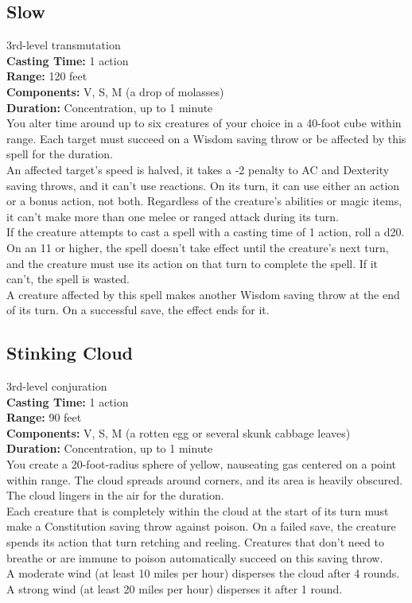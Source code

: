 \documentclass[11pt, A4paper, english]{article}
\begin{document}
		\subsection{Slow}
3rd-level transmutation \\
\textbf{Casting Time:} 1 action \\
\textbf{Range:} 120 feet \\
\textbf{Components:} V, S, M (a drop of molasses) \\
\textbf{Duration:} Concentration, up to 1 minute \\
You alter time around up to six creatures of your choice in a 40-foot cube within range. Each target must succeed on a Wisdom saving throw or be affected by this spell for the duration. \\
An affected target’s speed is halved, it takes a -2 penalty to AC and Dexterity saving throws, and it can’t use reactions. On its turn, it can use either an action or a bonus action, not both. Regardless of the creature’s abilities or magic items, it can’t make more than one melee or ranged attack during its turn. \\
If the creature attempts to cast a spell with a casting time of 1 action, roll a d20. On an 11 or higher, the spell doesn’t take effect until the creature’s next turn, and the creature must use its action on that turn to complete the spell. If it can’t, the spell is wasted. \\
A creature affected by this spell makes another Wisdom saving throw at the end of its turn. On a successful save, the effect ends for it.

		\subsection{Stinking Cloud}
3rd-level conjuration \\
\textbf{Casting Time:} 1 action \\
\textbf{Range:} 90 feet \\
\textbf{Components:} V, S, M (a rotten egg or several skunk cabbage leaves) \\
\textbf{Duration:} Concentration, up to 1 minute \\
You create a 20-foot-radius sphere of yellow, nauseating gas centered on a point within range. The cloud spreads around corners, and its area is heavily obscured. The cloud lingers in the air for the duration. \\
Each creature that is completely within the cloud at the start of its turn must make a Constitution saving throw against poison. On a failed save, the creature spends its action that turn retching and reeling. Creatures that don’t need to breathe or are immune to poison automatically succeed on this saving throw. \\
A moderate wind (at least 10 miles per hour) disperses the cloud after 4 rounds. A strong wind (at least 20 miles per hour) disperses it after 1 round.
\end{document}

